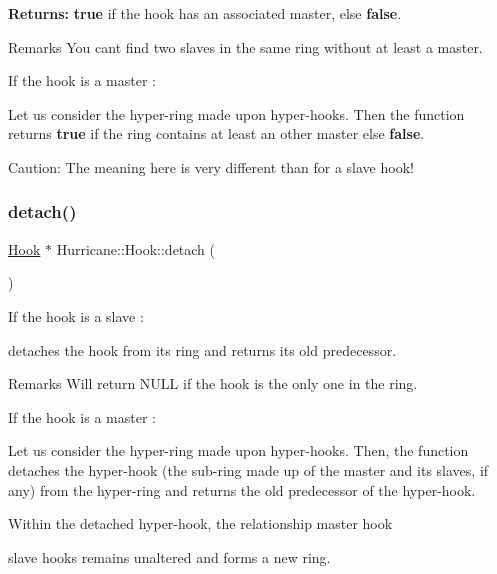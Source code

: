 {\bfseries Returns\+:} {\bfseries true} if the hook has an associated master, else {\bfseries false}.

\begin{DoxyRemark}{Remarks}
You can\textquotesingle{}t find two slaves in the same ring without at least a master.
\end{DoxyRemark}
If the hook is a master \+:

Let us consider the hyper-\/ring made upon hyper-\/hooks. Then the function returns {\bfseries true} if the ring contains at least an other master else {\bfseries false}.

\begin{DoxyParagraph}{Caution\+: The meaning here is very different than for a slave hook! }

\end{DoxyParagraph}
\mbox{\label{classHurricane_1_1Hook_a83f5beb5092e97947d24bd18adb33db1}} 
\subsubsection{\texorpdfstring{detach()}{detach()}}
{\footnotesize\ttfamily \mbox{\hyperlink{classHurricane_1_1Hook}{Hook}} $\ast$ Hurricane\+::\+Hook\+::detach (\begin{DoxyParamCaption}{ }\end{DoxyParamCaption})}

If the hook is a slave \+:

detaches the hook from its ring and returns its old predecessor.

\begin{DoxyRemark}{Remarks}
Will return N\+U\+LL if the hook is the only one in the ring.
\end{DoxyRemark}
If the hook is a master \+:

Let us consider the hyper-\/ring made upon hyper-\/hooks. Then, the function detaches the hyper-\/hook (the sub-\/ring made up of the master and its slaves, if any) from the hyper-\/ring and returns the old predecessor of the hyper-\/hook.

Within the detached hyper-\/hook, the relationship master hook
\begin{DoxyItemize}
\item slave hooks remains unaltered and forms a new ring.
\end{DoxyItemize}

